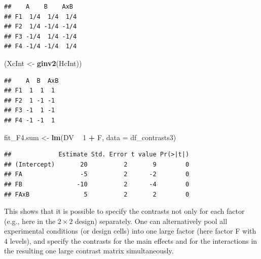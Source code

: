 \documentclass[12pt,]{krantz}
\newenvironment{Shaded}{\begin{snugshade}}{\end{snugshade}}
\newcommand{\DataTypeTok}[1]{\textcolor[rgb]{0.13,0.29,0.53}{#1}}
\newcommand{\DecValTok}[1]{\textcolor[rgb]{0.00,0.00,0.81}{#1}}
\newcommand{\KeywordTok}[1]{\textcolor[rgb]{0.13,0.29,0.53}{\textbf{#1}}}
\newcommand{\NormalTok}[1]{#1}
\newcommand{\OperatorTok}[1]{\textcolor[rgb]{0.81,0.36,0.00}{\textbf{#1}}}
\newcommand{\StringTok}[1]{\textcolor[rgb]{0.31,0.60,0.02}{#1}}
\begin{document}
\begin{verbatim}
##    A    B    AxB 
## F1  1/4  1/4  1/4
## F2  1/4 -1/4 -1/4
## F3 -1/4  1/4 -1/4
## F4 -1/4 -1/4  1/4
\end{verbatim}

\begin{Shaded}
\begin{Highlighting}[]
\NormalTok{(XcInt <-}\StringTok{ }\KeywordTok{ginv2}\NormalTok{(HcInt))}
\end{Highlighting}
\end{Shaded}

\begin{verbatim}
##    A  B  AxB
## F1  1  1  1 
## F2  1 -1 -1 
## F3 -1  1 -1 
## F4 -1 -1  1
\end{verbatim}

\begin{Shaded}
\end{Shaded}

\begin{Shaded}
\begin{Highlighting}[]
\NormalTok{fit_F4.sum <-}\StringTok{ }\KeywordTok{lm}\NormalTok{(DV }\OperatorTok{~}\StringTok{ }\DecValTok{1} \OperatorTok{+}\StringTok{ }\NormalTok{F,}
                 \DataTypeTok{data =}\NormalTok{ df_contrasts3) }
\end{Highlighting}
\end{Shaded}

\begin{Shaded}
\end{Shaded}

\begin{verbatim}
##             Estimate Std. Error t value Pr(>|t|)
## (Intercept)       20          2       9        0
## FA                -5          2      -2        0
## FB               -10          2      -4        0
## FAxB               5          2       2        0
\end{verbatim}

This shows that it is possible to specify the contrasts not only for each factor (e.g., here in the \(2 \times 2\) design) separately. One can alternatively pool all experimental conditions (or design cells) into one large factor (here factor F with \(4\) levels), and specify the contrasts for the main effects and for the interactions in the resulting one large contrast matrix simultaneously.
\end{document}
